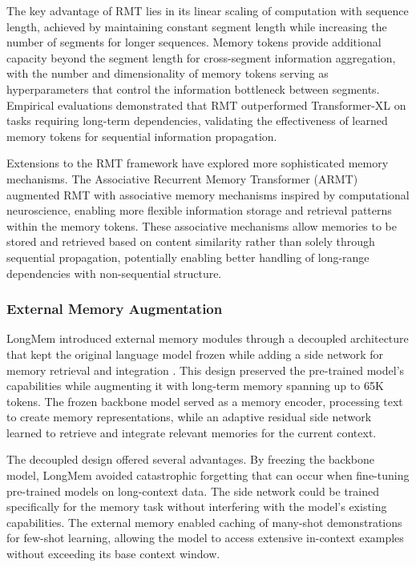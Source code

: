 The key advantage of RMT lies in its linear scaling of computation with sequence length, achieved by maintaining constant segment length while increasing the number of segments for longer sequences. Memory tokens provide additional capacity beyond the segment length for cross-segment information aggregation, with the number and dimensionality of memory tokens serving as hyperparameters that control the information bottleneck between segments. Empirical evaluations demonstrated that RMT outperformed Transformer-XL on tasks requiring long-term dependencies, validating the effectiveness of learned memory tokens for sequential information propagation.

Extensions to the RMT framework have explored more sophisticated memory mechanisms. The Associative Recurrent Memory Transformer (ARMT) augmented RMT with associative memory mechanisms inspired by computational neuroscience, enabling more flexible information storage and retrieval patterns within the memory tokens. These associative mechanisms allow memories to be stored and retrieved based on content similarity rather than solely through sequential propagation, potentially enabling better handling of long-range dependencies with non-sequential structure.

\subsubsection{External Memory Augmentation}

LongMem introduced external memory modules through a decoupled architecture that kept the original language model frozen while adding a side network for memory retrieval and integration \citep{wang2023augmenting}. This design preserved the pre-trained model's capabilities while augmenting it with long-term memory spanning up to 65K tokens. The frozen backbone model served as a memory encoder, processing text to create memory representations, while an adaptive residual side network learned to retrieve and integrate relevant memories for the current context.

The decoupled design offered several advantages. By freezing the backbone model, LongMem avoided catastrophic forgetting that can occur when fine-tuning pre-trained models on long-context data. The side network could be trained specifically for the memory task without interfering with the model's existing capabilities. The external memory enabled caching of many-shot demonstrations for few-shot learning, allowing the model to access extensive in-context examples without exceeding its base context window.

